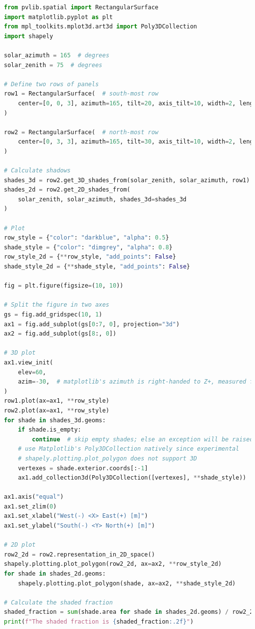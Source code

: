 \begin{lstlisting}[language=Python, caption={Caso de uso de ejemplo para la propuesta de cálculo de sombras en 3D.}, label={lst:sombreado_3d}]
from pvlib.spatial import RectangularSurface
import matplotlib.pyplot as plt
from mpl_toolkits.mplot3d.art3d import Poly3DCollection
import shapely

solar_azimuth = 165  # degrees
solar_zenith = 75  # degrees

# Define two rows of panels
row1 = RectangularSurface(  # south-most row
    center=[0, 0, 3], azimuth=165, tilt=20, axis_tilt=10, width=2, length=20
)

row2 = RectangularSurface(  # north-most row
    center=[0, 3, 3], azimuth=165, tilt=30, axis_tilt=10, width=2, length=20
)

# Calculate shadows
shades_3d = row2.get_3D_shades_from(solar_zenith, solar_azimuth, row1)
shades_2d = row2.get_2D_shades_from(
    solar_zenith, solar_azimuth, shades_3d=shades_3d
)

# Plot
row_style = {"color": "darkblue", "alpha": 0.5}
shade_style = {"color": "dimgrey", "alpha": 0.8}
row_style_2d = {**row_style, "add_points": False}
shade_style_2d = {**shade_style, "add_points": False}

fig = plt.figure(figsize=(10, 10))

# Split the figure in two axes
gs = fig.add_gridspec(10, 1)
ax1 = fig.add_subplot(gs[0:7, 0], projection="3d")
ax2 = fig.add_subplot(gs[8:, 0])

# 3D plot
ax1.view_init(
    elev=60,
    azim=-30,  # matplotlib's azimuth is right-handed to Z+, measured from X+
)
row1.plot(ax=ax1, **row_style)
row2.plot(ax=ax1, **row_style)
for shade in shades_3d.geoms:
    if shade.is_empty:
        continue  # skip empty shades; else an exception will be raised
    # use Matplotlib's Poly3DCollection natively since experimental
    # shapely.plotting.plot_polygon does not support 3D
    vertexes = shade.exterior.coords[:-1]
    ax1.add_collection3d(Poly3DCollection([vertexes], **shade_style))

ax1.axis("equal")
ax1.set_zlim(0)
ax1.set_xlabel("West(-) <X> East(+) [m]")
ax1.set_ylabel("South(-) <Y> North(+) [m]")

# 2D plot
row2_2d = row2.representation_in_2D_space()
shapely.plotting.plot_polygon(row2_2d, ax=ax2, **row_style_2d)
for shade in shades_2d.geoms:
    shapely.plotting.plot_polygon(shade, ax=ax2, **shade_style_2d)

# Calculate the shaded fraction
shaded_fraction = sum(shade.area for shade in shades_2d.geoms) / row2_2d.area
print(f"The shaded fraction is {shaded_fraction:.2f}")
\end{lstlisting}

